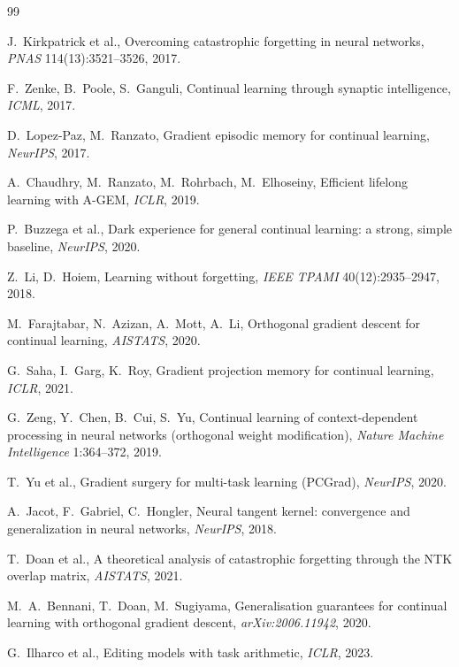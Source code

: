 \documentclass[10pt,a4paper]{article}
\theoremstyle{plain}
\theoremstyle{definition}
\begin{document}
\clearpage
\begin{thebibliography}{99}\small

 J.~Kirkpatrick et al., Overcoming catastrophic forgetting in neural
networks, \textit{PNAS} 114(13):3521--3526, 2017.

 F.~Zenke, B.~Poole, S.~Ganguli, Continual learning through synaptic
intelligence, \textit{ICML}, 2017.

 D.~Lopez-Paz, M.~Ranzato, Gradient episodic memory for continual
learning, \textit{NeurIPS}, 2017.

 A.~Chaudhry, M.~Ranzato, M.~Rohrbach, M.~Elhoseiny, Efficient lifelong
learning with A-GEM, \textit{ICLR}, 2019.

 P.~Buzzega et al., Dark experience for general continual learning: a
strong, simple baseline, \textit{NeurIPS}, 2020.

 Z.~Li, D.~Hoiem, Learning without forgetting, \textit{IEEE TPAMI}
40(12):2935--2947, 2018.

 M.~Farajtabar, N.~Azizan, A.~Mott, A.~Li, Orthogonal gradient descent
for continual learning, \textit{AISTATS}, 2020.

 G.~Saha, I.~Garg, K.~Roy, Gradient projection memory for continual learning,
\textit{ICLR}, 2021.

 G.~Zeng, Y.~Chen, B.~Cui, S.~Yu, Continual learning of context-dependent
processing in neural networks (orthogonal weight modification), \textit{Nature Machine
Intelligence} 1:364--372, 2019.

 T.~Yu et al., Gradient surgery for multi-task learning (PCGrad),
\textit{NeurIPS}, 2020.

 A.~Jacot, F.~Gabriel, C.~Hongler, Neural tangent kernel: convergence and
generalization in neural networks, \textit{NeurIPS}, 2018.

 T.~Doan et al., A theoretical analysis of catastrophic forgetting through the
NTK overlap matrix, \textit{AISTATS}, 2021.

 M.~A.~Bennani, T.~Doan, M.~Sugiyama, Generalisation guarantees for
continual learning with orthogonal gradient descent, \textit{arXiv:2006.11942}, 2020.

 G.~Ilharco et al., Editing models with task arithmetic, \textit{ICLR},
2023.


\end{thebibliography}
\end{document}

